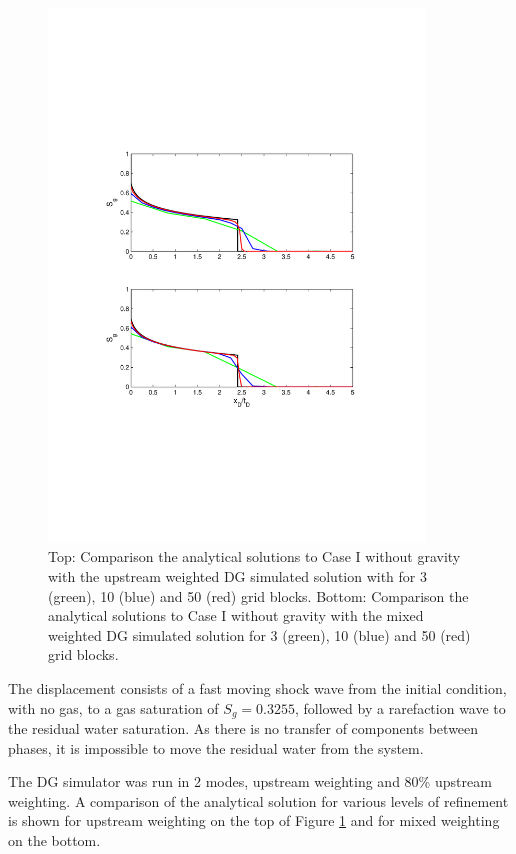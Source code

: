 \begin{figure}[h]
\centering
\includegraphics[width=10.0cm,height=15.cm]{./figures/BL_no_gravity}
\vspace{-4.cm}
\caption{Top: Comparison the analytical solutions to Case I without gravity with the upstream weighted DG simulated solution with for 3 (green), 10 (blue) and 50 (red) grid blocks.  Bottom: Comparison the analytical solutions to Case I without gravity with the mixed weighted DG simulated solution for 3 (green), 10 (blue) and 50 (red) grid blocks.} 
\label{fig:BL_no_grav}
\end{figure}


The displacement consists of a fast moving shock wave from the initial condition, with no gas, to a gas saturation of $S_g = 0.3255$, followed by a rarefaction wave to the residual water saturation. As there is no transfer of components between phases, it is impossible to move the residual water from the system.

The DG simulator was run in 2 modes, upstream weighting and 80\% upstream weighting.  A comparison of the analytical solution for various levels of refinement is shown for upstream weighting on the top of Figure \ref{fig:BL_no_grav} and for mixed weighting on the bottom. 

